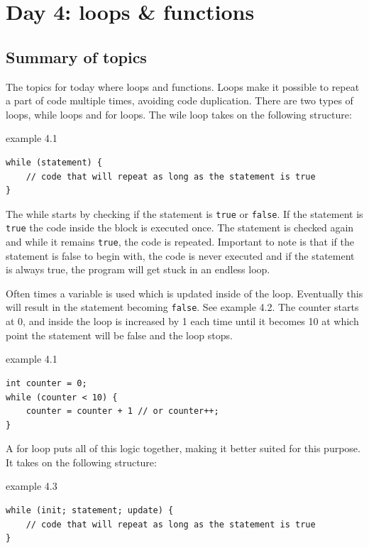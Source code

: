 \chapter{Day 4: loops \& functions}

\section{Summary of topics}

The topics for today where loops and functions. Loops make it possible to repeat a part of code multiple times, avoiding code duplication. There are two types of loops, while loops and for loops. The wile loop takes on the following structure:

\begin{codebox}{example 4.1}
    \begin{lstlisting}
while (statement) {
    // code that will repeat as long as the statement is true
}
    \end{lstlisting}
\end{codebox}

The while starts by checking if the statement is \texttt{true} or \texttt{false}. If the statement is \texttt{true} the code inside the block is executed once. The statement is checked again and while it remains \texttt{true}, the code is repeated. Important to note is that if the statement is false to begin with, the code is never executed and if the statement is always true, the program will get stuck in an endless loop.

Often times a variable is used which is updated inside of the loop. Eventually this will result in the statement becoming \texttt{false}. See example 4.2. The counter starts at 0, and inside the loop is increased by 1 each time until it becomes 10 at which point the statement will be false and the loop stops.

\begin{codebox}{example 4.1}
    \begin{lstlisting}
int counter = 0; 
while (counter < 10) { 
    counter = counter + 1 // or counter++; 
}
    \end{lstlisting}
\end{codebox}

A for loop puts all of this logic together, making it better suited for this purpose. It takes on the following structure:

\begin{codebox}{example 4.3}
    \begin{lstlisting}
while (init; statement; update) {
    // code that will repeat as long as the statement is true
}
    \end{lstlisting}
\end{codebox}

